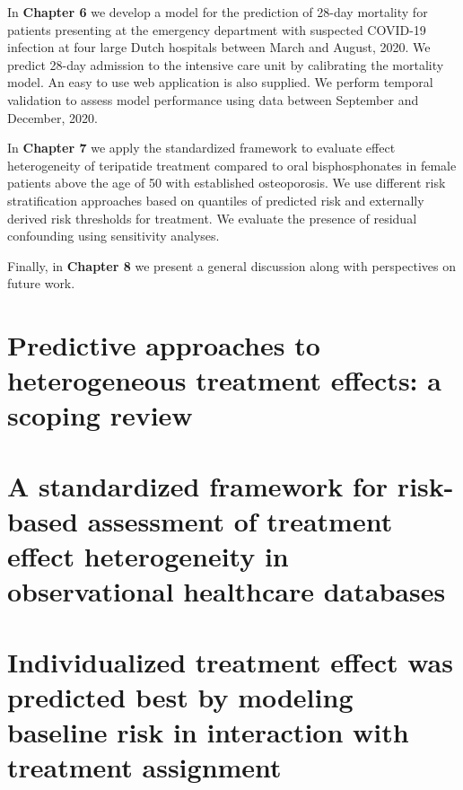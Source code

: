 \documentclass[
]{book}
\begin{document}
In \textbf{Chapter 6} we develop a model for the prediction of 28-day mortality for
patients presenting at the emergency department with suspected COVID-19
infection at four large Dutch hospitals between March and August, 2020. We
predict 28-day admission to the intensive care unit by calibrating the mortality
model. An easy to use web application is also supplied. We perform temporal
validation to assess model performance using data between September and
December, 2020.

In \textbf{Chapter 7} we apply the standardized framework to evaluate effect
heterogeneity of teripatide treatment compared to oral bisphosphonates in female
patients above the age of 50 with established osteoporosis. We use different
risk stratification approaches based on quantiles of predicted risk and
externally derived risk thresholds for treatment. We evaluate the presence of
residual confounding using sensitivity analyses.

Finally, in \textbf{Chapter 8} we present a general discussion along with
perspectives on future work.

\hypertarget{predictive-approaches-to-heterogeneous-treatment-effects-a-scoping-review}{%
\chapter{Predictive approaches to heterogeneous treatment effects: a scoping review}\label{predictive-approaches-to-heterogeneous-treatment-effects-a-scoping-review}}

\vspace*{\fill}\par
\pagebreak

\hypertarget{a-standardized-framework-for-risk-based-assessment-of-treatment-effect-heterogeneity-in-observational-healthcare-databases}{%
\chapter{A standardized framework for risk-based assessment of treatment effect heterogeneity in observational healthcare databases}\label{a-standardized-framework-for-risk-based-assessment-of-treatment-effect-heterogeneity-in-observational-healthcare-databases}}

\vspace*{\fill}\par
\pagebreak

\hypertarget{sim}{%
\chapter{Individualized treatment effect was predicted best by modeling baseline risk in interaction with treatment assignment}\label{sim}}
\end{document}
